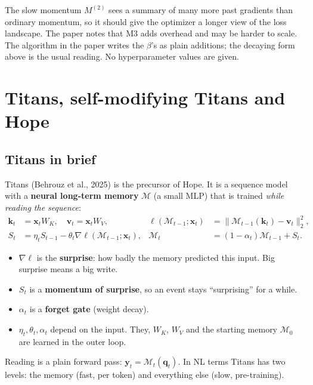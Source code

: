 \documentclass[11pt,a4paper]{article}
\newcommand{\M}{\mathcal{M}}
\newcommand{\bk}{\mathbf{k}}
\newcommand{\bv}{\mathbf{v}}
\newcommand{\bq}{\mathbf{q}}
\newcommand{\bx}{\mathbf{x}}
\newcommand{\by}{\mathbf{y}}
\begin{document}
The slow momentum $M^{(2)}$ sees a summary of many more past gradients than ordinary momentum, so it should give the optimizer a longer view of the loss landscape. The paper notes that M3 adds overhead and may be harder to scale. The algorithm in the paper writes the $\beta$'s as plain additions; the decaying form above is the usual reading. No hyperparameter values are given.

\section{Titans, self-modifying Titans and Hope}

\subsection{Titans in brief}
Titans (Behrouz et al., 2025) is the precursor of Hope. It is a sequence model with a \textbf{neural long-term memory} $\M$ (a small MLP) that is trained \emph{while reading the sequence}:
\begin{align}
  \bk_t &= \bx_tW_K,\quad \bv_t = \bx_tW_V, & \ell(\M_{t-1};\bx_t) &= \|\M_{t-1}(\bk_t)-\bv_t\|_2^2,\\
  S_t &= \eta_t S_{t-1} - \theta_t\nabla\ell(\M_{t-1};\bx_t), & \M_t &= (1-\alpha_t)\M_{t-1} + S_t .
\end{align}
\begin{itemize}
  \item $\nabla\ell$ is the \textbf{surprise}: how badly the memory predicted this input. Big surprise means a big write.
  \item $S_t$ is a \textbf{momentum of surprise}, so an event stays ``surprising'' for a while.
  \item $\alpha_t$ is a \textbf{forget gate} (weight decay).
  \item $\eta_t,\theta_t,\alpha_t$ depend on the input. They, $W_K$, $W_V$ and the starting memory $\M_0$ are learned in the outer loop.
\end{itemize}
Reading is a plain forward pass: $\by_t = \M_t(\bq_t)$. In NL terms Titans has two levels: the memory (fast, per token) and everything else (slow, pre-training).
\end{document}
